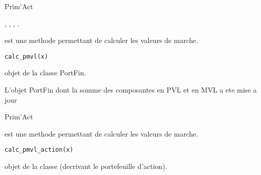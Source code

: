 \documentclass[a4paper]{book}
\begin{document}
%
\begin{Author}\relax
Prim'Act
\end{Author}
%
\begin{SeeAlso}\relax
{}, , ,
.
\end{SeeAlso}
%
\begin{Description}\relax
{} est une methode permettant de calculer les valeurs de marche.
\end{Description}
%
\begin{Usage}
\begin{verbatim}
calc_pmvl(x)
\end{verbatim}
\end{Usage}
%
\begin{Arguments}
\begin{ldescription}
\item[\code{x}] objet de la classe PortFin.
\end{ldescription}
\end{Arguments}
%
\begin{Value}
L'objet PortFin dont la somme des composantes en PVL et en MVL a ete mise a jour
\end{Value}
%
\begin{Author}\relax
Prim'Act
\end{Author}
%
\begin{Description}\relax
{} est une methode permettant de calculer les valeurs de marche.
\end{Description}
%
\begin{Usage}
\begin{verbatim}
calc_pmvl_action(x)
\end{verbatim}
\end{Usage}
%
\begin{Arguments}
\begin{ldescription}
\item[\code{x}] objet de la classe  (decrivant le portefeuille d'action).
\end{ldescription}
\end{Arguments}
\end{document}
